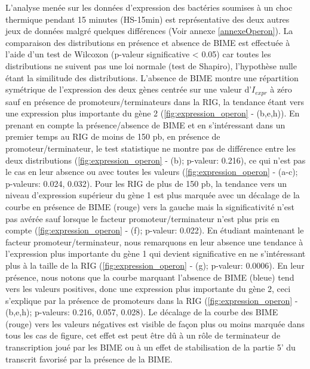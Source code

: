 \documentclass[12pt,a4paper]{report}
\begin{document}
\begin{onehalfspace}
L'analyse menée sur les données d'expression des bactéries soumises à un choc thermique pendant 15 minutes (HS-15min) est représentative des deux autres jeux de données malgré quelques différences (Voir annexe \ref{annexeOperon}). La comparaison des distributions en présence et absence de BIME est effectuée à l'aide d'un test de Wilcoxon (p-valeur significative < 0.05) car toutes les distributions ne suivent pas une loi normale (test de Shapiro), l'hypothèse nulle étant la similitude des distributions. L'absence de BIME montre une répartition symétrique de l'expression des deux gènes centrée sur une valeur d'$I_{expr}$ à zéro sauf en présence de promoteurs/terminateurs dans la RIG, la tendance étant vers une expression plus importante du gène 2 (\autoref{fig:expression_operon} - (b,e,h)).
En prenant en compte la présence/absence de BIME et en s'intéressant dans un premier temps au RIG de moins de 150 pb, en présence de promoteur/terminateur, le test statistique ne montre pas de différence entre les deux distributions (\autoref{fig:expression_operon} - (b); p-valeur: 0.216), ce qui n'est pas le cas en leur absence ou avec toutes les valeurs (\autoref{fig:expression_operon} - (a-c); p-valeurs: 0.024, 0.032). 
Pour les RIG de plus de 150 pb, la tendance vers un niveau d'expression supérieur du gène 1 est plus marquée avec un décalage de la courbe en présence de BIME (rouge) vers la gauche mais la significativité n'est pas avérée sauf lorsque le facteur promoteur/terminateur n'est plus pris en compte  (\autoref{fig:expression_operon} - (f); p-valeur: 0.022). 
En étudiant maintenant le facteur promoteur/terminateur, nous remarquons en leur absence une tendance à l'expression plus importante du gène 1 qui devient significative en ne s'intéressant plus à la taille de la RIG (\autoref{fig:expression_operon} - (g); p-valeur: 0.0006). En leur présence, nous notons que la courbe marquant l'absence de BIME (bleue) tend vers les valeurs positives, donc une expression plus importante du gène 2, ceci s'explique par la présence de promoteurs dans la RIG (\autoref{fig:expression_operon} - (b,e,h); p-valeurs: 0.216, 0.057, 0.028). Le décalage de la courbe des BIME (rouge) vers les valeurs négatives est visible de façon plus ou moins marquée dans tous les cas de figure, cet effet est peut être dû à un rôle de terminateur de transcription joué par les BIME ou à un effet de stabilisation de la partie 5' du transcrit favorisé par la présence de la BIME.


\end{onehalfspace}
\end{document}
